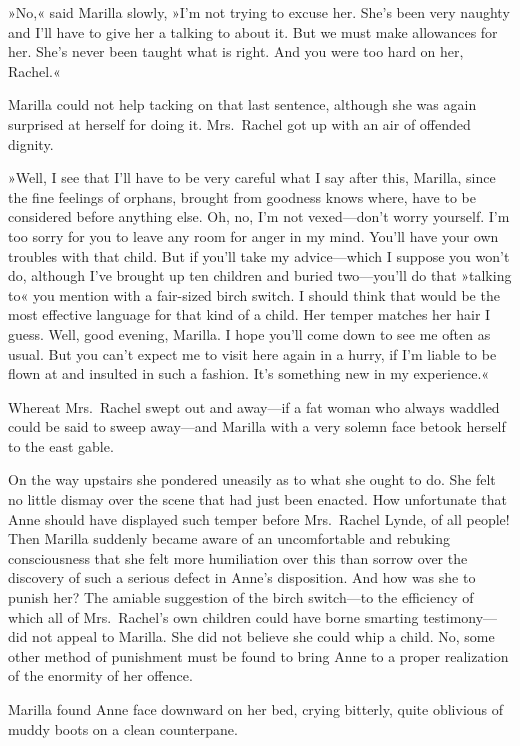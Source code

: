 »No,« said Marilla slowly, »I'm not trying to excuse her. She's been very naughty and I'll have to give her a talking to about it. But we must make allowances for her. She's never been taught what is right. And you were too hard on her, Rachel.«

Marilla could not help tacking on that last sentence, although she was again surprised at herself for doing it. Mrs.~Rachel got up with an air of offended dignity.

»Well, I see that I'll have to be very careful what I say after this, Marilla, since the fine feelings of orphans, brought from goodness knows where, have to be considered before anything else. Oh, no, I'm not vexed—don't worry yourself. I'm too sorry for you to leave any room for anger in my mind. You'll have your own troubles with that child. But if you'll take my advice—which I suppose you won't do, although I've brought up ten children and buried two—you'll do that »talking to« you mention with a fair-sized birch switch. I should think that would be the most effective language for that kind of a child. Her temper matches her hair I guess. Well, good evening, Marilla. I hope you'll come down to see me often as usual. But you can't expect me to visit here again in a hurry, if I'm liable to be flown at and insulted in such a fashion. It's something new in my experience.«

Whereat Mrs.~Rachel swept out and away—if a fat woman who always waddled could be said to sweep away—and Marilla with a very solemn face betook herself to the east gable.

On the way upstairs she pondered uneasily as to what she ought to do. She felt no little dismay over the scene that had just been enacted. How unfortunate that Anne should have displayed such temper before Mrs.~Rachel Lynde, of all people! Then Marilla suddenly became aware of an uncomfortable and rebuking consciousness that she felt more humiliation over this than sorrow over the discovery of such a serious defect in Anne's disposition. And how was she to punish her? The amiable suggestion of the birch switch—to the efficiency of which all of Mrs.~Rachel's own children could have borne smarting testimony—did not appeal to Marilla. She did not believe she could whip a child. No, some other method of punishment must be found to bring Anne to a proper realization of the enormity of her offence.

Marilla found Anne face downward on her bed, crying bitterly, quite oblivious of muddy boots on a clean counterpane.

